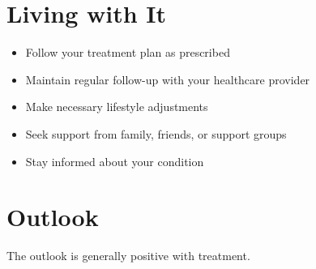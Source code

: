 \section{Living with It}
\begin{itemize}[noitemsep]
  \item Follow your treatment plan as prescribed
  \item Maintain regular follow-up with your healthcare provider
  \item Make necessary lifestyle adjustments
  \item Seek support from family, friends, or support groups
  \item Stay informed about your condition
\end{itemize}
\section{Outlook}
The outlook is generally positive with treatment.
